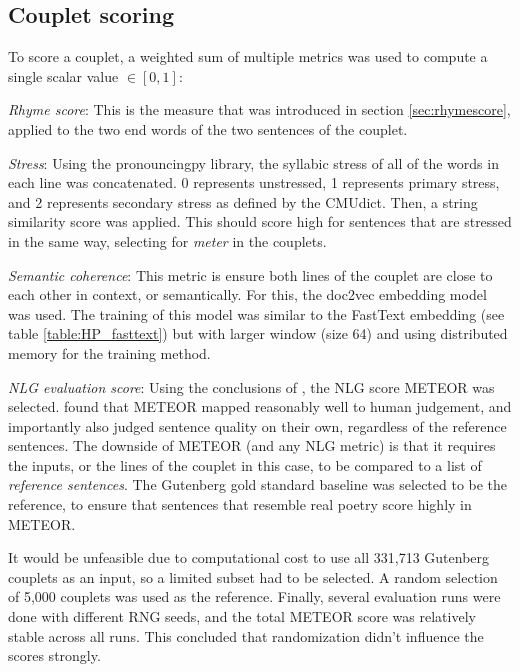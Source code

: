 \documentclass[11pt,a4paper]{article}
\newenvironment{tight_itemize}{
\begin{itemize}
\setlength{\itemsep}{0pt}
\setlength{\parskip}{0pt}
}{\end{itemize}}
\begin{document}
\subsection{Couplet scoring}
\label{sec:coupletscore}
To score a couplet, a weighted sum of multiple metrics was used to compute a single scalar value $\in [0, 1]$:
\begin{tight_itemize}
	\vspace{-0.5em}
	\item \textit{Rhyme score}: This is the measure that was introduced in section \ref{sec:rhymescore}, applied to the two end words of the two sentences of the couplet.
	\item \textit{Stress}: Using the pronouncingpy library, the syllabic stress of all of the words in each line was concatenated. 0 represents unstressed, 1 represents primary stress, and 2 represents secondary stress as defined by the CMUdict. Then, a string similarity score \cite{ratcliff} was applied. This should score high for sentences that are stressed in the same way, selecting for \textit{meter} in the couplets.
	\item \textit{Semantic coherence}: This metric is ensure both lines of the couplet are close to each other in context, or semantically. For this, the doc2vec embedding model \cite{docvec} was used. The training of this model was similar to the FastText embedding (see table \ref{table:HP_fasttext}) but with larger window (size 64) and using distributed memory for the training method.
	\item \textit{NLG evaluation score}: Using the conclusions of \citet{nlgeval}, the NLG score METEOR \cite{meteor} was selected. \citet{nlgeval} found that METEOR mapped reasonably well to human judgement, and importantly also judged sentence quality on their own, regardless of the reference sentences. The downside of METEOR (and any NLG metric) is that it requires the inputs, or the lines of the couplet in this case, to be compared to a list of \textit{reference sentences}. The Gutenberg gold standard baseline was selected to be the reference, to ensure that sentences that resemble real poetry score highly in METEOR.

		It would be unfeasible due to computational cost to use all 331,713 Gutenberg couplets as an input, so a limited subset had to be selected. A random selection of 5,000 couplets was used as the reference. Finally, several evaluation runs were done with different RNG seeds, and the total METEOR score was relatively stable across all runs. This concluded that randomization didn't influence the scores strongly.
\end{tight_itemize}
\end{document}
